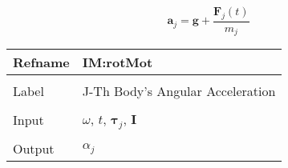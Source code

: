 \documentclass[12pt]{article}
\begin{document}
\begin{displaymath}
{\symbf{a}_{j}}=\symbf{g}+\frac{{\symbf{F}_{j}}\left(t\right)}{{m_{j}}}
\end{displaymath}
\vspace{\baselineskip}
\noindent
\begin{minipage}{\textwidth}
\begin{tabular}{>{\raggedright}p{}>{\raggedright\arraybackslash}p{}}
\toprule \textbf{Refname} & \textbf{IM:rotMot}
\label{IM:rotMot}
\\ \midrule \\
Label & J-Th Body's Angular Acceleration
        
\\ \midrule \\
Input & $ω$, $t$, ${\symbf{τ}_{j}}$, $\symbf{I}$
        
\\ \midrule \\
Output & ${α_{j}}$
         

\end{tabular}
\end{minipage}
\end{document}
